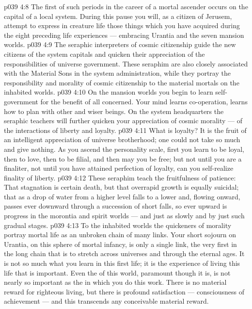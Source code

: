 \vs p039 4:8 The first of such periods in the career of a mortal ascender occurs on the capital of a local system. During this pause you will, as a citizen of Jerusem, attempt to express in creature life those things which you have acquired during the eight preceding life experiences --- embracing Urantia and the seven mansion worlds.
\vs p039 4:9 The seraphic interpreters of cosmic citizenship guide the new citizens of the system capitals and quicken their appreciation of the responsibilities of universe government. These seraphim are also closely associated with the Material Sons in the system administration, while they portray the responsibility and morality of cosmic citizenship to the material mortals on the inhabited worlds.
\vs p039 4:10 \pc {}\bibnobreakspace {} On the mansion worlds you begin to learn self\hyp{}government for the benefit of all concerned. Your mind learns co\hyp{}operation, learns how to plan with other and wiser beings. On the system headquarters the seraphic teachers will further quicken your appreciation of cosmic morality --- of the interactions of liberty and loyalty.
\vs p039 4:11 What is loyalty? It is the fruit of an intelligent appreciation of universe brotherhood; one could not take so much and give nothing. As you ascend the personality scale, first you learn to be loyal, then to love, then to be filial, and then may you be free; but not until you are a finaliter, not until you have attained perfection of loyalty, can you self\hyp{}realize finality of liberty.
\vs p039 4:12 \pc These seraphim teach the fruitfulness of patience: That stagnation is certain death, but that overrapid growth is equally suicidal; that as a drop of water from a higher level falls to a lower and, flowing onward, passes ever downward through a succession of short falls, so ever upward is progress in the morontia and spirit worlds --- and just as slowly and by just such gradual stages.
\vs p039 4:13 To the inhabited worlds the quickeners of morality portray mortal life as an unbroken chain of many links. Your short sojourn on Urantia, on this sphere of mortal infancy, is only a single link, the very first in the long chain that is to stretch across universes and through the eternal ages. It is not so much what you learn in this first life; it is the experience of living this life that is important. Even the  of this world, paramount though it is, is not nearly so important as the  in which you do this work. There is no material reward for righteous living, but there is profound satisfaction --- consciousness of achievement --- and this transcends any conceivable material reward.
